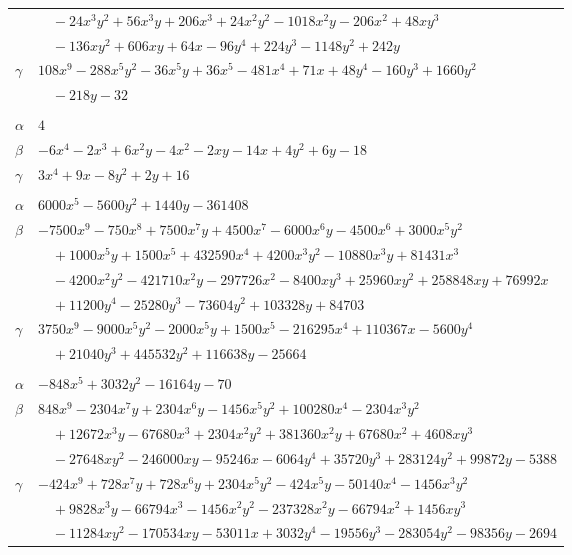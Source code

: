 \documentclass[11pt]{article}
\begin{document}
\begin{longtable}{@{}ll@{}}
 & $\quad -24x^{3}y^{2}+56x^{3}y+206x^{3}+24x^{2}y^{2}-1018x^{2}y-206x^{2}+48xy^{3}$\\
 & $\quad -136xy^{2}+606xy+64x-96y^{4}+224y^{3}-1148y^{2}+242y$\\
$\gamma$ & $108x^{9}-288x^{5}y^{2}-36x^{5}y+36x^{5}-481x^{4}+71x+48y^{4}-160y^{3}+1660y^{2}$\\
 & $\quad -218y-32$\\
\addlinespace[3pt]
\multicolumn{2}{@{}l}{$\{i,j\}=\{17,29\}$, $k_{ij}=2^{2}\cdot 7$}\\
$\alpha$ & $4$\\
$\beta$ & $-6x^{4}-2x^{3}+6x^{2}y-4x^{2}-2xy-14x+4y^{2}+6y-18$\\
$\gamma$ & $3x^{4}+9x-8y^{2}+2y+16$\\
\addlinespace[3pt]
\multicolumn{2}{@{}l}{$\{i,j\}=\{17,30\}$, $k_{ij}=2^{11}\cdot 3^{3}\cdot 7$}\\
$\alpha$ & $6000x^{5}-5600y^{2}+1440y-361408$\\
$\beta$ & $-7500x^{9}-750x^{8}+7500x^{7}y+4500x^{7}-6000x^{6}y-4500x^{6}+3000x^{5}y^{2}$\\
 & $\quad +1000x^{5}y+1500x^{5}+432590x^{4}+4200x^{3}y^{2}-10880x^{3}y+81431x^{3}$\\
 & $\quad -4200x^{2}y^{2}-421710x^{2}y-297726x^{2}-8400xy^{3}+25960xy^{2}+258848xy+76992x$\\
 & $\quad +11200y^{4}-25280y^{3}-73604y^{2}+103328y+84703$\\
$\gamma$ & $3750x^{9}-9000x^{5}y^{2}-2000x^{5}y+1500x^{5}-216295x^{4}+110367x-5600y^{4}$\\
 & $\quad +21040y^{3}+445532y^{2}+116638y-25664$\\
\addlinespace[3pt]
\multicolumn{2}{@{}l}{$\{i,j\}=\{17,32\}$, $k_{ij}=2\cdot 5\cdot 7$}\\
$\alpha$ & $-848x^{5}+3032y^{2}-16164y-70$\\
$\beta$ & $848x^{9}-2304x^{7}y+2304x^{6}y-1456x^{5}y^{2}+100280x^{4}-2304x^{3}y^{2}$\\
 & $\quad +12672x^{3}y-67680x^{3}+2304x^{2}y^{2}+381360x^{2}y+67680x^{2}+4608xy^{3}$\\
 & $\quad -27648xy^{2}-246000xy-95246x-6064y^{4}+35720y^{3}+283124y^{2}+99872y-5388$\\
$\gamma$ & $-424x^{9}+728x^{7}y+728x^{6}y+2304x^{5}y^{2}-424x^{5}y-50140x^{4}-1456x^{3}y^{2}$\\
 & $\quad +9828x^{3}y-66794x^{3}-1456x^{2}y^{2}-237328x^{2}y-66794x^{2}+1456xy^{3}$\\
 & $\quad -11284xy^{2}-170534xy-53011x+3032y^{4}-19556y^{3}-283054y^{2}-98356y-2694$\\

\end{longtable}
\end{document}

